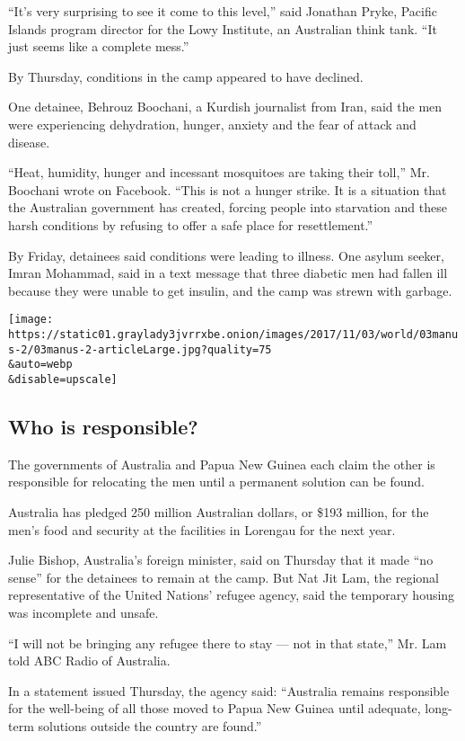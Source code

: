``It's very surprising to see it come to this level,'' said Jonathan
Pryke, Pacific Islands program director for the Lowy Institute, an
Australian think tank. ``It just seems like a complete mess.''

By Thursday, conditions in the camp appeared to have declined.

One detainee, Behrouz Boochani, a Kurdish journalist from Iran, said the
men were experiencing dehydration, hunger, anxiety and the fear of
attack and disease.

``Heat, humidity, hunger and incessant mosquitoes are taking their
toll,'' Mr. Boochani wrote on Facebook. ``This is not a hunger strike.
It is a situation that the Australian government has created, forcing
people into starvation and these harsh conditions by refusing to offer a
safe place for resettlement.''

By Friday, detainees said conditions were leading to illness. One asylum
seeker, Imran Mohammad, said in a text message that three diabetic men
had fallen ill because they were unable to get insulin, and the camp was
strewn with garbage.

\texttt{[image: https://static01.graylady3jvrrxbe.onion/images/2017/11/03/world/03manus-2/03manus-2-articleLarge.jpg?quality=75\\\&auto=webp\\\&disable=upscale]}

\hypertarget{who-is-responsible}{%
\subsection{Who is responsible?}\label{who-is-responsible}}

The governments of Australia and Papua New Guinea each claim the other
is responsible for relocating the men until a permanent solution can be
found.

Australia has pledged 250 million Australian dollars, or \$193 million,
for the men's food and security at the facilities in Lorengau for the
next year.

Julie Bishop, Australia's foreign minister, said on Thursday that it
made ``no sense'' for the detainees to remain at the camp. But Nat Jit
Lam, the regional representative of the United Nations' refugee agency,
said the temporary housing was incomplete and unsafe.

``I will not be bringing any refugee there to stay --- not in that
state,'' Mr. Lam told ABC Radio of Australia.

In a statement issued Thursday, the agency said: ``Australia remains
responsible for the well-being of all those moved to Papua New Guinea
until adequate, long-term solutions outside the country are found.''

